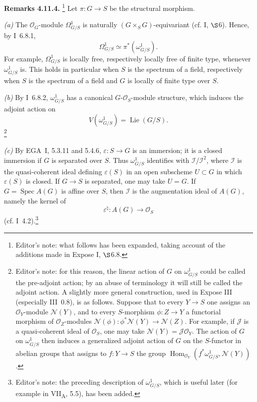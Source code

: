 \medskip
\noindent\textbf{Remarks 4.11.4.}
\footnote{Editor's note: what follows has been expanded, taking account
of the additions made in Expose I, \(\S\)6.8.}
Let \(\pi:G\to S\) be the structural morphism.

\textit{(a)} The \(\mathcal O_G\)-module \(\Omega^1_{G/S}\) is
naturally \((G\times_SG)\)-equivariant (cf. I, \(\S\)6). Hence, by
I~6.8.1,
\[
 \Omega^1_{G/S}\simeq\pi^*(\omega^1_{G/S}).
\]
For example, \(\Omega^1_{G/S}\) is locally free, respectively locally
free of finite type, whenever \(\omega^1_{G/S}\) is. This holds in
particular when \(S\) is the spectrum of a field, respectively when
\(S\) is the spectrum of a field and \(G\) is locally of finite type
over \(S\).

\textit{(b)} By I~6.8.2, \(\omega^1_{G/S}\) has a canonical
\(G\)-\(\mathcal O_S\)-module structure, which induces the adjoint
action on
\[
 V(\omega^1_{G/S})=\operatorname{Lie}(G/S).
\]
\footnote{Editor's note: for this reason, the linear action of \(G\) on
\(\omega^1_{G/S}\) could be called the pre-adjoint action; by an abuse
of terminology it will still be called the adjoint action. A slightly
more general construction, used in Expose III (especially III~0.8), is
as follows. Suppose that to every \(Y\to S\) one assigns an
\(\mathcal O_Y\)-module \(\mathcal N(Y)\), and to every
\(S\)-morphism \(\phi:Z\to Y\) a functorial morphism of
\(\mathcal O_Z\)-modules
\(\mathcal N(\phi):\phi^*\mathcal N(Y)\to\mathcal N(Z)\).
For example, if \(\mathcal J\) is a quasi-coherent ideal of
\(\mathcal O_S\), one may take
\(\mathcal N(Y)=\mathcal J\mathcal O_Y\). The action of \(G\) on
\(\omega^1_{G/S}\) then induces a generalized adjoint action of \(G\)
on the \(S\)-functor in abelian groups that assigns to
\(f:Y\to S\) the group
\(\operatorname{Hom}_{\mathcal O_Y}
(f^*\omega^1_{G/S},\mathcal N(Y))\).}

\textit{(c)} By EGA~I, 5.3.11 and 5.4.6,
\(\varepsilon:S\to G\) is an immersion; it is a closed immersion if
\(G\) is separated over \(S\). Thus \(\omega^1_{G/S}\) identifies
with \(\mathcal I/\mathcal I^2\), where \(\mathcal I\) is the
quasi-coherent ideal defining \(\varepsilon(S)\) in an open
subscheme \(U\subset G\) in which \(\varepsilon(S)\) is closed. If
\(G\to S\) is separated, one may take \(U=G\). If
\(G=\operatorname{Spec}A(G)\) is affine over \(S\), then
\(\mathcal I\) is the augmentation ideal of \(A(G)\), namely the
kernel of
\[
 \varepsilon^\natural:A(G)\longrightarrow\mathcal O_S
\]
(cf. I~4.2).\footnote{Editor's note: the preceding description of
\(\omega^1_{G/S}\), which is useful later (for example in
VII\textsubscript{A}, 5.5), has been added.}

